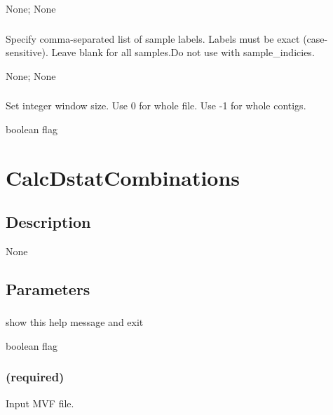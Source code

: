 \documentclass[letterpaper,11pt,english]{sphinxmanual}
\begin{document}
 None;  None


\subsubsection{}
\label{\detokenize{prog_desc:id52}}
 Specify comma-separated list of sample labels. Labels must be exact (case-sensitive). Leave blank for all samples.Do not use with \textendash{}sample\_indicies.

 None;  None


\subsubsection{}
\label{\detokenize{prog_desc:windowsize}}
 Set integer window size. Use 0 for whole file. Use -1 for whole contigs.

 boolean flag


\section{CalcDstatCombinations}
\label{\detokenize{prog_desc:calcdstatcombinations}}

\subsection{Description}
\label{\detokenize{prog_desc:id53}}
None


\subsection{Parameters}
\label{\detokenize{prog_desc:id54}}

\subsubsection{}
\label{\detokenize{prog_desc:id55}}
 show this help message and exit

 boolean flag


\subsubsection{ (required)}
\label{\detokenize{prog_desc:id56}}
 Input MVF file.
\end{document}
